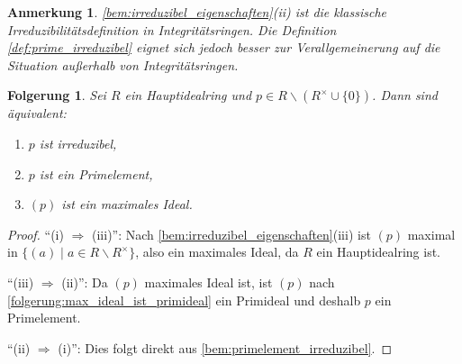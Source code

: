 \documentclass[a4paper, twoside, 11pt, ngerman]{report}
\renewcommand{\setminus}{\smallsetminus}
\theoremstyle{definistyle}
\newtheorem{anm}[satz]{Anmerkung}
\newtheorem{folgerung}[satz]{Folgerung}
\theoremstyle{remark}
\begin{document}
\begin{anm}\label{anm:klassische_irreduzibilität}
\ref{bem:irreduzibel_eigenschaften}(ii) ist die klassische Irreduzibilitätsdefinition in Integritätsringen. Die Definition \ref{def:prime_irreduzibel} eignet sich jedoch besser zur Verallgemeinerung auf die Situation außerhalb von Integritätsringen.
\end{anm}

\begin{folgerung}\label{folg:irreduzibel_primelement_maximal}
Sei $R$ ein Hauptidealring und $p \in R \setminus (R^\times \cup \{0\})$. Dann sind äquivalent:
\begin{enumerate}[label=(\roman*)]
    \item $p$ ist irreduzibel,
    \item $p$ ist ein Primelement,
    \item $(p)$ ist ein maximales Ideal.
\end{enumerate}
\end{folgerung}

\begin{proof}
"`(i) $\Rightarrow$ (iii)"': Nach \ref{bem:irreduzibel_eigenschaften}(iii) ist $(p)$ maximal in $\{(a) \mid a \in R \setminus R^\times\}$, also ein maximales Ideal, da $R$ ein Hauptidealring ist.

"`(iii) $\Rightarrow$ (ii)"': Da $(p)$ maximales Ideal ist, ist $(p)$ nach \ref{folgerung:max_ideal_ist_primideal} ein Primideal  und deshalb $p$ ein Primelement.

"`(ii) $\Rightarrow$ (i)"': Dies folgt direkt aus \ref{bem:primelement_irreduzibel}.
\end{proof}
\end{document}
